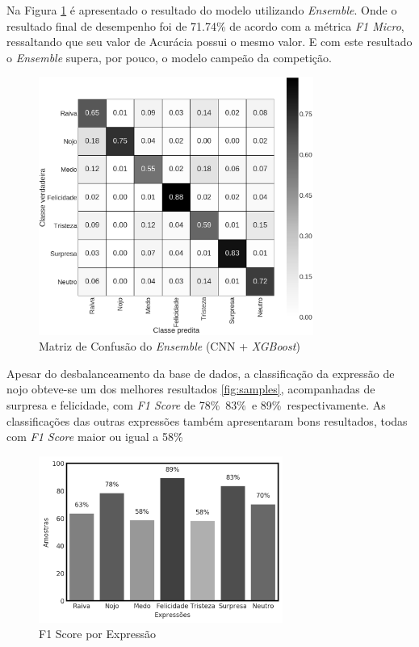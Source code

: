 Na Figura \ref{fig:emsemble} é apresentado o resultado do modelo utilizando \emph{Ensemble}. Onde o resultado final de desempenho foi de 71.74\% de acordo com a métrica \emph{F1 Micro}, ressaltando que seu valor de Acurácia possui o mesmo valor. E com este resultado o \emph{Ensemble} supera, por pouco, o modelo campeão da competição.

\begin{figure}[!htb]
    \centering
    \includegraphics[width=9cm]{images/cm_emsemble.png}
    \caption{Matriz de Confusão do \emph{Ensemble} (CNN + \emph{XGBoost})}
    \label{fig:emsemble}
\end{figure}

Apesar do desbalanceamento da base de dados, a classificação da expressão de nojo obteve-se um dos melhores resultados \ref{fig:samples}, acompanhadas de surpresa e felicidade, com \textit{F1 Score} de
78\%\, 83\%\ e 89\%\ respectivamente. As classificações das outras expressões também apresentaram bons resultados, todas com \textit{F1 Score} maior ou igual a 58\%\.

\begin{figure}[!htb]
    \centering
    \includegraphics[width=8cm]{images/f1_bar.png}
    \caption{F1 Score por Expressão}
    \label{fig:f1_bar}
\end{figure}
